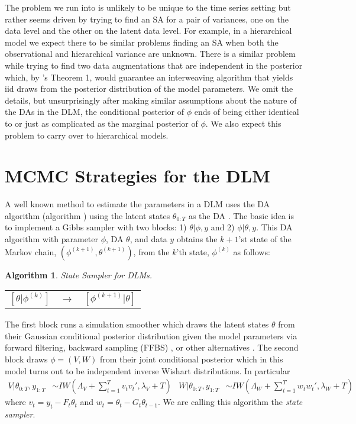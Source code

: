 \documentclass{article}
\newtheorem{alg}{Algorithm}
\begin{document}
The problem we run into is unlikely to be unique to the time series setting but rather seems driven by trying to find an SA for a pair of variances, one on the data level and the other on the latent data level. For example, in a hierarchical model we expect there to be similar problems finding an SA when both the observational and hierarchical variance are unknown. There is a similar problem while trying to find two data augmentations that are independent in the posterior which, by 's Theorem 1, would guarantee an interweaving algorithm that yields iid draws from the posterior distribution of the model parameters. We omit the details, but unsurprisingly after making similar assumptions about the nature of the DAs in the DLM, the conditional posterior of $\phi$ ends of being either identical to or just as complicated as the marginal posterior of $\phi$. We also expect this problem to carry over to hierarchical models.

\section{MCMC Strategies for the DLM}\label{sec:Algs}

A well known method to estimate the parameters in a DLM uses the DA algorithm (algorithm \cite{alg:DA}) using the latent states $\theta_{0:T}$ as the DA \cite{fruhwirth1994data,carter1994gibbs}. The basic idea is to implement a Gibbs sampler with two blocks: 1) $\theta|\phi,y$ and 2) $\phi|\theta,y$. This DA algorithm with parameter $\phi$, DA $\theta$, and data $y$ obtains the $k+1$'st state of the Markov chain, $(\phi^{(k+1)},\theta^{(k+1)})$, from the $k$'th state, $\phi^{(k)}$ as follows:
\begin{alg}State Sampler for DLMs.\label{alg:state}\\
  \begin{center}
    \begin{tabular}{lll}
      $[\theta|\phi^{(k)}]$& $\to$& $[\phi^{(k+1)}|\theta]$
    \end{tabular}
  \end{center}
\noindent \end{alg}
The first block runs a simulation smoother which draws the latent states $\theta$ from their Gaussian conditional posterior distribution given the model parameters via forward filtering, backward sampling (FFBS) \cite{fruhwirth1994data,carter1994gibbs}, or other alternatives \cite{koopman1993disturbance,de1995simulation,mccausland2011simulation}. The second block draws $\phi=(V,W)$ from their joint conditional posterior which in this model turns out to be independent inverse Wishart distributions. In particular
\begin{align}
  V|\theta_{0:T},y_{1:T} &\sim IW\left(\Lambda_V + \sum_{t=1}^Tv_tv_t',\lambda_V + T\right) &
  W|\theta_{0:T},y_{1:T} &\sim IW\left(\Lambda_W + \sum_{t=1}^Tw_tw_t',\lambda_{W} + T\right) \label{eq:VWcond}
\end{align}
where $v_t = y_t - F_t\theta_t$ and $w_t = \theta_t - G_t\theta_{t-1}$. We are calling this algorithm the {\it state sampler}.
\end{document}
